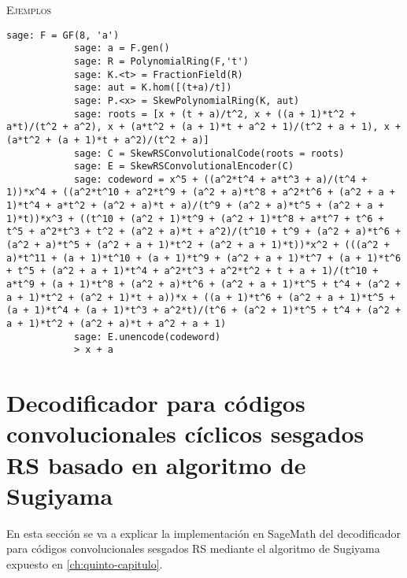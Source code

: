 \begin{description}[leftmargin=1em, font=\normalfont\ttfamily, style=nextline]
\begin{description}[font=\ttfamily,style=nextline]
        \textsc{Ejemplos}

        \begin{lstlisting}[gobble=10]
            sage: F = GF(8, 'a')
            sage: a = F.gen()
            sage: R = PolynomialRing(F,'t')
            sage: K.<t> = FractionField(R)
            sage: aut = K.hom([(t+a)/t])
            sage: P.<x> = SkewPolynomialRing(K, aut)
            sage: roots = [x + (t + a)/t^2, x + ((a + 1)*t^2 + a*t)/(t^2 + a^2), x + (a*t^2 + (a + 1)*t + a^2 + 1)/(t^2 + a + 1), x + (a*t^2 + (a + 1)*t + a^2)/(t^2 + a)]
            sage: C = SkewRSConvolutionalCode(roots = roots) 
            sage: E = SkewRSConvolutionalEncoder(C)
            sage: codeword = x^5 + ((a^2*t^4 + a*t^3 + a)/(t^4 + 1))*x^4 + ((a^2*t^10 + a^2*t^9 + (a^2 + a)*t^8 + a^2*t^6 + (a^2 + a + 1)*t^4 + a*t^2 + (a^2 + a)*t + a)/(t^9 + (a^2 + a)*t^5 + (a^2 + a + 1)*t))*x^3 + ((t^10 + (a^2 + 1)*t^9 + (a^2 + 1)*t^8 + a*t^7 + t^6 + t^5 + a^2*t^3 + t^2 + (a^2 + a)*t + a^2)/(t^10 + t^9 + (a^2 + a)*t^6 + (a^2 + a)*t^5 + (a^2 + a + 1)*t^2 + (a^2 + a + 1)*t))*x^2 + (((a^2 + a)*t^11 + (a + 1)*t^10 + (a + 1)*t^9 + (a^2 + a + 1)*t^7 + (a + 1)*t^6 + t^5 + (a^2 + a + 1)*t^4 + a^2*t^3 + a^2*t^2 + t + a + 1)/(t^10 + a*t^9 + (a + 1)*t^8 + (a^2 + a)*t^6 + (a^2 + a + 1)*t^5 + t^4 + (a^2 + a + 1)*t^2 + (a^2 + 1)*t + a))*x + ((a + 1)*t^6 + (a^2 + a + 1)*t^5 + (a + 1)*t^4 + (a + 1)*t^3 + a^2*t)/(t^6 + (a^2 + 1)*t^5 + t^4 + (a^2 + a + 1)*t^2 + (a^2 + a)*t + a^2 + a + 1)
            sage: E.unencode(codeword)
            > x + a
        \end{lstlisting}        
    \end{description}
\end{description}

\section{Decodificador para códigos convolucionales cíclicos sesgados RS basado en algoritmo de Sugiyama}

En esta sección se va a explicar la implementación en SageMath del decodificador para códigos convolucionales sesgados RS mediante el algoritmo de Sugiyama expuesto en \ref{ch:quinto-capitulo}.

